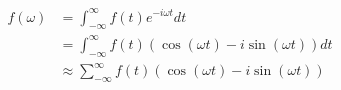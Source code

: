 
\begin{displaymath}
  \begin{array}{rl}
    f(\omega) &= \int^\infty_{-\infty}f(t)e^{-i \omega t} dt \\
    &= \int^\infty_{-\infty}f(t)(\cos(\omega t) - i \sin(\omega t)) dt \\
    &\approx \sum^\infty_{-\infty}f(t)(\cos(\omega t) - i \sin(\omega t))
  \end{array}
\end{displaymath}



